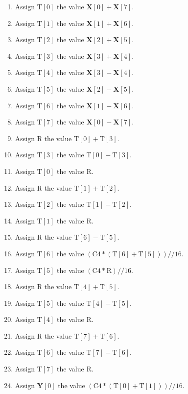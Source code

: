 \documentclass[9pt,letterpaper]{book}
\newcommand{\bitvar}[1]{\ensuremath{\mathbf{\bm{#1}}}}
\newcommand{\locvar}[1]{\ensuremath{\mathrm{#1}}}
\numberwithin{equation}{chapter}
\numberwithin{figure}{chapter}
\numberwithin{table}{chapter}
\begin{document}
\begin{enumerate}
\item
Assign $\locvar{T}[0]$ the value $\bitvar{X}[0]+\bitvar{X}[7]$.
\item
Assign $\locvar{T}[1]$ the value $\bitvar{X}[1]+\bitvar{X}[6]$.
\item
Assign $\locvar{T}[2]$ the value $\bitvar{X}[2]+\bitvar{X}[5]$.
\item
Assign $\locvar{T}[3]$ the value $\bitvar{X}[3]+\bitvar{X}[4]$.
\item
Assign $\locvar{T}[4]$ the value $\bitvar{X}[3]-\bitvar{X}[4]$.
\item
Assign $\locvar{T}[5]$ the value $\bitvar{X}[2]-\bitvar{X}[5]$.
\item
Assign $\locvar{T}[6]$ the value $\bitvar{X}[1]-\bitvar{X}[6]$.
\item
Assign $\locvar{T}[7]$ the value $\bitvar{X}[0]-\bitvar{X}[7]$.
\item
Assign \locvar{R} the value $\locvar{T}[0]+\locvar{T}[3]$.
\item
Assign $\locvar{T}[3]$ the value $\locvar{T}[0]-\locvar{T}[3]$.
\item
Assign $\locvar{T}[0]$ the value \locvar{R}.
\item
Assign \locvar{R} the value $\locvar{T}[1]+\locvar{T}[2]$.
\item
Assign $\locvar{T}[2]$ the value $\locvar{T}[1]-\locvar{T}[2]$.
\item
Assign $\locvar{T}[1]$ the value \locvar{R}.
\item
Assign \locvar{R} the value $\locvar{T}[6]-\locvar{T}[5]$.
\item
Assign $\locvar{T}[6]$ the value
 $(\locvar{C4}*(\locvar{T}[6]+\locvar{T}[5]))//16$.
\item
Assign $\locvar{T}[5]$ the value $(\locvar{C4}*\locvar{R})//16$.
\item
Assign \locvar{R} the value $\locvar{T}[4]+\locvar{T}[5]$.
\item
Assign $\locvar{T}[5]$ the value $\locvar{T}[4]-\locvar{T}[5]$.
\item
Assign $\locvar{T}[4]$ the value \locvar{R}.
\item
Assign \locvar{R} the value $\locvar{T}[7]+\locvar{T}[6]$.
\item
Assign $\locvar{T}[6]$ the value $\locvar{T}[7]-\locvar{T}[6]$.
\item
Assign $\locvar{T}[7]$ the value \locvar{R}.
\item
Assign $\bitvar{Y}[0]$ the value
 $(\locvar{C4}*(\locvar{T}[0]+\locvar{T}[1]))//16$.

\end{enumerate}
\end{document}
